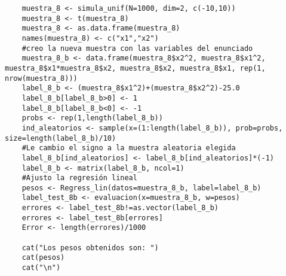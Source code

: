 	\begin{lstlisting}
	muestra_8 <- simula_unif(N=1000, dim=2, c(-10,10))
	muestra_8 <- t(muestra_8)
	muestra_8 <- as.data.frame(muestra_8)
	names(muestra_8) <- c("x1","x2")
	#creo la nueva muestra con las variables del enunciado
	muestra_8_b <- data.frame(muestra_8$x2^2, muestra_8$x1^2, muestra_8$x1*muestra_8$x2, muestra_8$x2, muestra_8$x1, rep(1, nrow(muestra_8)))
	label_8_b <- (muestra_8$x1^2)+(muestra_8$x2^2)-25.0
	label_8_b[label_8_b>0] <- 1
	label_8_b[label_8_b<0] <- -1
	probs <- rep(1,length(label_8_b))
	ind_aleatorios <- sample(x=(1:length(label_8_b)), prob=probs, size=length(label_8_b)/10)
	#Le cambio el signo a la muestra aleatoria elegida
	label_8_b[ind_aleatorios] <- label_8_b[ind_aleatorios]*(-1)
	label_8_b <- matrix(label_8_b, ncol=1)
	#Ajusto la regresión lineal
	pesos <- Regress_lin(datos=muestra_8_b, label=label_8_b)
	label_test_8b <- evaluacion(x=muestra_8_b, w=pesos)
	errores <- label_test_8b!=as.vector(label_8_b)
	errores <- label_test_8b[errores]
	Error <- length(errores)/1000
	
	cat("Los pesos obtenidos son: ")
	cat(pesos)
	cat("\n")
	\end{lstlisting}
	
